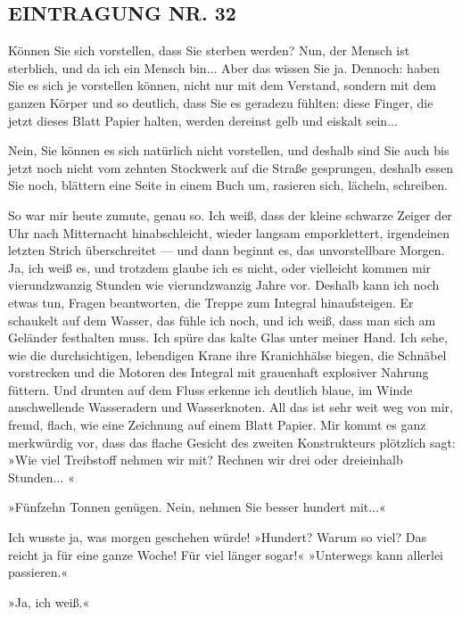 \subsection{EINTRAGUNG NR. 32}

Können Sie sich vorstellen, dass Sie sterben werden? Nun, der
Mensch ist sterblich, und da ich ein Mensch bin... Aber das wissen
Sie ja. Dennoch: haben Sie es sich je vorstellen können, nicht nur
mit dem Verstand, sondern mit dem ganzen Körper und so deutlich,
dass Sie es geradezu fühlten: diese Finger, die jetzt dieses Blatt
Papier halten, werden dereinst gelb und eiskalt sein...

Nein, Sie können es sich natürlich nicht vorstellen, und deshalb
sind Sie auch bis jetzt noch nicht vom zehnten Stockwerk auf die
Straße gesprungen, deshalb essen Sie noch, blättern eine Seite in
einem Buch um, rasieren sich, lächeln, schreiben.

So war mir heute zumute, genau so. Ich weiß, dass der kleine
schwarze Zeiger der Uhr nach Mitternacht hinabschleicht, wieder
langsam emporklettert, irgendeinen letzten Strich überschreitet —
und dann beginnt es, das unvorstellbare Morgen. Ja, ich weiß es,
und trotzdem glaube ich es nicht, oder vielleicht kommen mir
vierundzwanzig Stunden wie vierundzwanzig Jahre vor. Deshalb kann
ich noch etwas tun, Fragen beantworten, die Treppe zum Integral
hinaufsteigen. Er schaukelt auf dem Wasser, das fühle ich noch, und
ich weiß, dass man sich am Geländer festhalten muss. Ich spüre das
kalte Glas unter meiner Hand. Ich sehe, wie die durchsichtigen,
lebendigen Krane ihre Kranichhälse biegen, die Schnäbel vorstrecken
und die Motoren des Integral mit grauenhaft explosiver Nahrung
füttern. Und drunten auf dem Fluss erkenne ich deutlich blaue, im
Winde anschwellende Wasseradern und Wasserknoten. All das ist sehr
weit weg von mir, fremd, flach, wie eine Zeichnung auf einem Blatt
Papier. Mir kommt es ganz merkwürdig vor, dass das flache Gesicht
des zweiten Konstrukteurs plötzlich sagt: »Wie viel Treibstoff
nehmen wir mit? Rechnen wir drei oder dreieinhalb Stunden... «

»Fünfzehn Tonnen genügen. Nein, nehmen Sie besser hundert mit...«

Ich wusste ja, was morgen geschehen würde! »Hundert? Warum so viel?
Das reicht ja für eine ganze Woche! Für viel länger sogar!«
»Unterwegs kann allerlei passieren.«

»Ja, ich weiß.«

